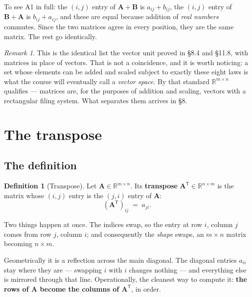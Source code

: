 \documentclass[11pt]{article}
\theoremstyle{plain}
\theoremstyle{definition}
\newtheorem{defn}{Definition}[section]
\theoremstyle{remark}
\newtheorem*{rmk}{Remark}
\newcommand{\R}{\mathbb{R}}
\newcommand{\mt}[1]{\mathbf{#1}}        %
\newcommand{\T}{^{\mathsf{T}}}          %
\begin{document}
\noindent To see A1 in full: the $(i,j)$ entry of $\mt{A}+\mt{B}$ is
$a_{ij}+b_{ij}$, the $(i,j)$ entry of $\mt{B}+\mt{A}$ is $b_{ij}+a_{ij}$, and
these are equal because addition of \emph{real numbers} commutes. Since the two
matrices agree in every position, they are the same matrix. The rest go
identically.

\begin{rmk}
This is the identical list the vector unit proved in \S8.4 and \S11.8, with
matrices in place of vectors. That is not a coincidence, and it is worth
noticing: a set whose elements can be added and scaled subject to exactly these
eight laws is what the course will eventually call a \emph{vector space}. By
that standard $\R^{m\times n}$ qualifies --- matrices are, for the purposes of
addition and scaling, vectors with a rectangular filing system. What separates
them arrives in \S8.
\end{rmk}

\section{The transpose}

\subsection{The definition}
\begin{defn}[Transpose]
Let $\mt{A}\in\R^{m\times n}$. Its \textbf{transpose} $\mt{A}\T\in\R^{n\times m}$
is the matrix whose $(i,j)$ entry is the $(j,i)$ entry of $\mt{A}$:
\[
  (\mt{A}\T)_{ij} \;=\; a_{ji} .
\]
\end{defn}

\noindent Two things happen at once. The indices swap, so the entry at row $i$,
column $j$ comes from row $j$, column $i$; and consequently the \emph{shape}
swaps, an $m\times n$ matrix becoming $n\times m$.

Geometrically it is a reflection across the main diagonal. The diagonal entries
$a_{ii}$ stay where they are --- swapping $i$ with $i$ changes nothing --- and
everything else is mirrored through that line. Operationally, the cleanest way
to compute it: \textbf{the rows of $\mt{A}$ become the columns of $\mt{A}\T$},
in order.
\end{document}

